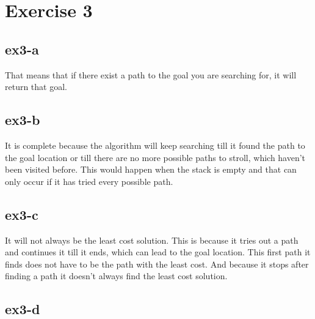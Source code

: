 \section{Exercise 3}
\subsection{ex3-a}
That means that if there exist a path to the goal you are searching for, it will return that goal.

\subsection{ex3-b}
It is complete because the algorithm will keep searching till it found the path to the goal location or till there are no more
possible paths to stroll, which haven't been visited before. This would happen when the stack is empty
and that can only occur if it has tried every possible path.

\subsection{ex3-c}
It will not always be the least cost solution. This is because it tries out a path and continues it till it ends, which can
lead to the goal location. This first path it finds does not have to be the path with the least cost.
And because it stops after finding a path it doesn't always find the least cost solution.

\subsection{ex3-d}
